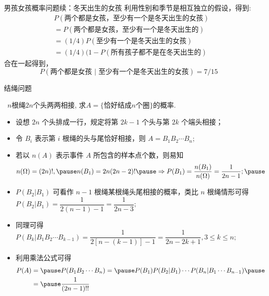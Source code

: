 		\begin{frame}{男孩女孩概率问题续：冬天出生的女孩}
			利用性别和季节是相互独立的假设，得到:
        \begin{align*}
            &P (\mbox{两个都是女孩，至少有一个是冬天出生的女孩})\\
            &=P (\mbox{两个都是女孩，至少有一个是冬天出生的})\\
            &=(1/4) P (\mbox{至少有一个是冬天出生的女孩})\\
            &=(1/4) (1-P (\mbox{所有孩子都不是在冬天出生的})
        \end{align*}
        合在一起得到，$$P (\mbox{两个都是女孩 | 至少有一个是冬天出生的女孩})=7/15$$
\end{frame}


\begin{frame}{结绳问题}
	\vspace{-0cm}
	\begin{exam}\
		$n$根绳$2n$个头两两相接, 求$A=\{\mbox{恰好结成} n\mbox{个圈}\}$的概率.
	\end{exam}
	\pause
	\begin{itemize}[<+-|alert@+>]
		\item 设想 $2n$ 个头排成一行，规定将第 $2k-1$ 个头与第 $2k$ 个端头相接；
		\item 令 $B_i$ 表示第 $i$ 根绳的头与尾恰好相接，则 $A=B_1B_2\cdots B_n$;
		\item 若以 $n (A)$ 表示事件 $A$ 所包含的样本点个数，则易知 \pause
		{\small \begin{eqnarray*}
			n(\Omega)=(2n)!, \pause n(B_1)=2n(2n-2)!\pause \Rightarrow P(B_1)=\dfrac{n(B_1)}{n(\Omega)}=\dfrac{1}{2n-1};\pause
		\end{eqnarray*}}
		\item $P (B_2|B_1)$ 可看作 $n-1$ 根绳某根绳头尾相接的概率，类比 $n$ 根绳情形可得 $P (B_2|B_1)=\dfrac{1}{2 (n-1)-1}=\dfrac{1}{2n-3};$
		\item 同理可得 {\small $P (B_k|B_1B_2\cdots B_{k-1})=\dfrac{1}{2[n-(k-1)]-1}=\dfrac{1}{2n-2k+1}, 3\leq k\leq n;$}
		\item 利用乘法公式可得
		{\small\begin{align*}
			P(A)&=\pause P(B_1B_2\cdots B_n)=\pause P(B_1)P(B_2|B_1)\cdots P(B_n|B_1\cdots B_{n-1})\pause\\
			&=\pause\dfrac{1}{(2n-1)!!}
		\end{align*}}
	\end{itemize}


\end{frame}

